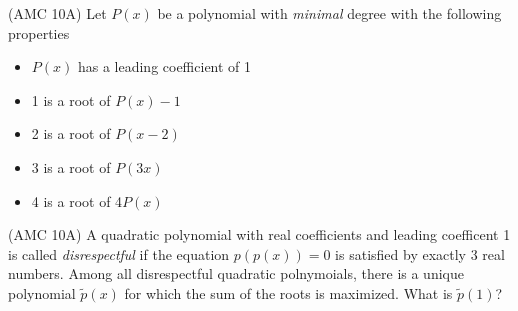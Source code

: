 \documentclass[11pt]{article}
\begin{document}
\begin{exercise}
    (AMC 10A) Let $P(x)$ be a polynomial with \textit{minimal} degree with the following properties
    \begin{itemize}
        \item $P(x)$ has a leading coefficient of 1
        \item 1 is a root of $P(x)-1$
        \item 2 is a root of $P(x-2)$
        \item 3 is a root of $P(3x)$
        \item 4 is a root of 4$P(x)$
    \end{itemize}
\end{exercise}
\begin{exercise}
    (AMC 10A) A quadratic polynomial with real coefficients and leading coefficent 1 is called \textit{disrespectful} if the equation $p(p(x))=0$ is satisfied by exactly 3 real numbers. Among all disrespectful quadratic polnymoials, there is a unique polynomial $\widetilde{p}(x)$ for which the sum of the roots is maximized. What is $\widetilde{p}(1)$?
\end{exercise}
\end{document}
